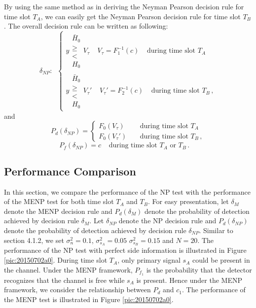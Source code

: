 By using the same method as in deriving the Neyman Pearson decision rule for time slot $T_A$, we can easily get the Neyman Pearson decision rule for time slot $T_B$. The overall decision rule can be written as following:
\begin{equation}
  \delta_{NP}:\;\;
\begin{cases}
 y  \substack{\bar{H}_0 \\ \geq \\ < \\ H_0} V_\tau\;\;\;\;V_\tau = F_1^{-1}(c)\;\;\;\;\text{during time slot $T_A$}\\
y  \substack{\bar{H}_0 \\ \geq \\ < \\ H_0} V_\tau'\;\;\;\;V_\tau' = F_2^{-1}(c)\;\;\;\;\text{during time slot $T_B$}\,,
\end{cases}
\label{20150702b1}
\end{equation}
and 
\begin{equation}
  P_d(\delta_{NP}) = \begin{cases}
    F_0(V_\tau)\;\;\;\;&\text{during time slot $T_A$}\\
    F_0(V_\tau')\;\;\;\;&\text{during time slot $T_B$}\,,
  \end{cases}
  \label{20150702b2}
\end{equation} 
\begin{equation}
  P_f(\delta_{NP}) = c\;\;\;\;\text{during time slot $T_A$ or $T_B$}\,.\;\;\;\;
\end{equation}

\subsection{Performance Comparison}
In this section, we compare the performance of the NP test with the performance of the MENP test for both time slot $T_A$ and $T_B$. For easy presentation, let $\delta_{M}$ denote the MENP decision rule and $P_d(\delta_M)$ denote the probability of detection achieved by decision rule $\delta_{M}$.  
Let $\delta_{NP} $ denote the NP decision rule and $P_d(\delta_{NP})$ denote the probability of detection achieved by decision rule $\delta_{NP}$. 
Similar to section 4.1.2, we set $\sigma_n^2= 0.1$, $\sigma_{s_A}^2 = 0.05$ $\sigma_{s_B}^2 = 0.15$ and $N=20$. 
The performance of the NP test with perfect side information is illustrated in Figure \ref{pic:20150702a0}.  
During time slot $T_A$, only primary signal $s_A$ could be present in the channel. Under the MENP framework, $P_{f_1}$ is the probability that the detector recognizes that the channel is free while $s_A$ is present. 
Hence under the MENP framework, we consider the relationship between $P_d$ and $c_1$. The performance of the MENP test is illustrated in Figure \ref{pic:20150702a0}.  

